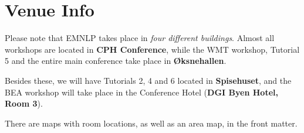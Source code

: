 \setheaders{}{}
\section{Venue Info}{}

Please note that EMNLP takes place in \textit{four different buildings}. Almost all workshops are located in \textbf{CPH Conference}, while the WMT workshop, Tutorial 5 and the entire main conference take place in \textbf{Øksnehallen}. 

Besides these, we will have Tutorials 2, 4 and 6 located in \textbf{Spisehuset}, and the BEA workshop will take place in the Conference Hotel (\textbf{DGI Byen Hotel, Room 3}).

There are maps with room locations, as well as an area map, in the front matter.